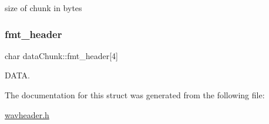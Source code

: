 size of chunk in bytes 

\mbox{\label{structdataChunk_a846343045c6f7168e969f3a4f19a44e1}} 
\subsubsection{\texorpdfstring{fmt\+\_\+header}{fmt\_header}}
{\footnotesize\ttfamily char data\+Chunk\+::fmt\+\_\+header\mbox{[}4\mbox{]}}



D\+A\+TA. 



The documentation for this struct was generated from the following file\+:\begin{DoxyCompactItemize}
\item 
\hyperlink{wavheader_8h}{wavheader.\+h}\end{DoxyCompactItemize}

